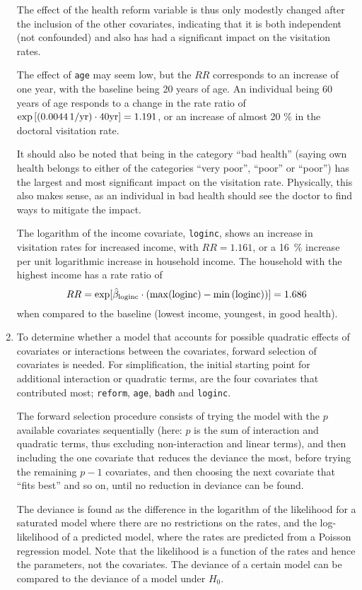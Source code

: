 \documentclass[a4paper,11pt]{article}
\begin{document}
\begin{enumerate}[label=2\alph*)]
        The effect of the health reform variable is thus only modestly changed after the inclusion of the other covariates, indicating that it is both independent (not confounded) and also has had a significant impact on the visitation rates.
        
        The effect of \texttt{age} may seem low, but the $RR$ corresponds to an increase of one year, with the baseline being 20 years of age. An individual being 60 years of age responds to a change in the rate ratio of $\exp\left[\rm (0.0044 \, 1/yr) \cdot 40 yr \right] = 1.191$, or an increase of almost 20 \% in the doctoral visitation rate. 

        It should also be noted that being in the category ``bad health'' (saying own health belongs to either of the categories ``very poor'', ``poor'' or ``poor'') has the largest and most significant impact on the visitation rate. Physically, this also makes sense, as an individual in bad health should see the doctor to find ways to mitigate the impact.

        The logarithm of the income covariate, \texttt{loginc}, shows an increase in visitation rates for increased income, with $RR = 1.161$, or a 16~\% increase per unit logarithmic increase in household income. The household with the highest income has a rate ratio of
        \[
        RR = \exp[\hat{\beta}_{\rm loginc} \cdot \left( \max({\rm loginc}) - \min\left( {\rm loginc} \right) \right)] = 1.686
        \]
        when compared to the baseline (lowest income, youngest, in good health).

    \item To determine whether a model that accounts for possible quadratic effects of covariates or interactions between the covariates, forward selection of covariates is needed. For simplification, the initial starting point for additional interaction or quadratic terms, are the four covariates that contributed most; \texttt{reform}, \texttt{age}, \texttt{badh} and \texttt{loginc}.

        The forward selection procedure consists of trying the model with the $p$ available covariates sequentially (here: $p$ is the sum of interaction and quadratic terms, thus excluding non-interaction and linear terms), and then including the one covariate that reduces the deviance the most, before trying the remaining $p-1$ covariates, and then choosing the next covariate that ``fits best'' and so on, until no reduction in deviance can be found. 

        The deviance is found as the difference in the logarithm of the likelihood for a saturated model where there are no restrictions on the rates, and the log-likelihood of a predicted model, where the rates are predicted from a Poisson regression model. Note that the likelihood is a function of the rates and hence the parameters, not the covariates. The deviance of a certain model can be compared to the deviance of a model under $H_0$. 


\end{enumerate}
\end{document}
